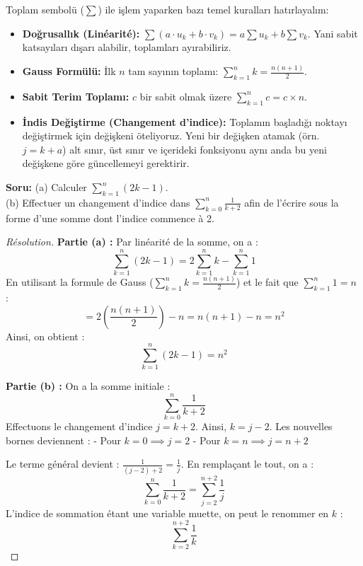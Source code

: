 \documentclass[12pt,a4paper]{report}
\begin{document}
\begin{tcolorbox}[colback=purple!5!white,colframe=purple!75!black,title=Hatırlatma (Rappel): Toplam Sembolü Özellikleri]
Toplam sembolü ($\sum$) ile işlem yaparken bazı temel kuralları hatırlayalım:
\begin{itemize}
    \item \textbf{Doğrusallık (Linéarité):} $\sum (a \cdot u_k + b \cdot v_k) = a \sum u_k + b \sum v_k$. Yani sabit katsayıları dışarı alabilir, toplamları ayırabiliriz.
    \item \textbf{Gauss Formülü:} İlk $n$ tam sayının toplamı: $\sum_{k=1}^n k = \frac{n(n+1)}{2}$.
    \item \textbf{Sabit Terim Toplamı:} $c$ bir sabit olmak üzere $\sum_{k=1}^n c = c \times n$.
    \item \textbf{İndis Değiştirme (Changement d'indice):} Toplamın başladığı noktayı değiştirmek için değişkeni öteliyoruz. Yeni bir değişken atamak (örn. $j = k + a$) alt sınır, üst sınır ve içerideki fonksiyonu aynı anda bu yeni değişkene göre güncellemeyi gerektirir.
\end{itemize}
\end{tcolorbox}

\textbf{Soru:}
(a) Calculer $\sum_{k=1}^n (2k - 1)$.\\
(b) Effectuer un changement d'indice dans $\sum_{k=0}^n \frac{1}{k+2}$ afin de l'écrire sous la forme d'une somme dont l'indice commence à 2.

\begin{proof}[Résolution]
\textbf{Partie (a) :}
Par linéarité de la somme, on a :
\[ \sum_{k=1}^n (2k - 1) = 2 \sum_{k=1}^n k - \sum_{k=1}^n 1 \]
En utilisant la formule de Gauss ($\sum_{k=1}^n k = \frac{n(n+1)}{2}$) et le fait que $\sum_{k=1}^n 1 = n$ :
\[ = 2 \left( \frac{n(n+1)}{2} \right) - n = n(n+1) - n = n^2 \]
Ainsi, on obtient :
\[ \sum_{k=1}^n (2k - 1) = n^2 \]

\textbf{Partie (b) :}
On a la somme initiale : 
\[ \sum_{k=0}^n \frac{1}{k+2} \]
Effectuons le changement d'indice $j = k + 2$. Ainsi, $k = j - 2$.
Les nouvelles bornes deviennent :
- Pour $k = 0 \implies j = 2$
- Pour $k = n \implies j = n + 2$

Le terme général devient : $\frac{1}{(j-2)+2} = \frac{1}{j}$.
En remplaçant le tout, on a :
\[ \sum_{k=0}^n \frac{1}{k+2} = \sum_{j=2}^{n+2} \frac{1}{j} \]
L'indice de sommation étant une variable muette, on peut le renommer en $k$ :
\[ \sum_{k=2}^{n+2} \frac{1}{k} \]
\end{proof}
\end{document}
